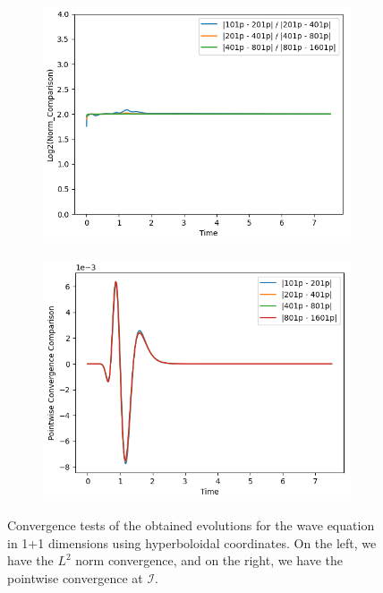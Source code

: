 \begin{figure}[h]
    \centering
    \begin{subfigure}[b]{0.45\textwidth}
        \centering
        \includegraphics[width=\textwidth]{Images/Wave_Equation_1+1-Norm.png}
    \end{subfigure}
    \hfill
    \begin{subfigure}[b]{0.45\textwidth}
        \centering
        \includegraphics[width=\textwidth]{Images/Wave_Equation_1+1-Pointwise.png}
    \end{subfigure}
    \caption{Convergence tests of the obtained evolutions for the wave equation in 1+1 dimensions using hyperboloidal coordinates. On the left, we have the $L^2$ norm convergence, and on the right, we have the pointwise convergence at $\mathscr{I}$.}
    \label{fig:compact_wave_equation-2nd_order-convergence}
\end{figure}

